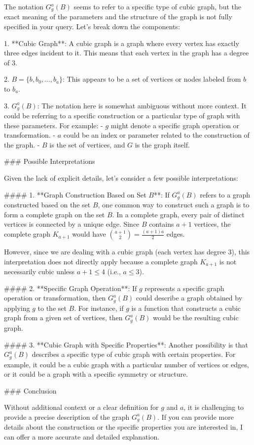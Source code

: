 The notation \( G^a_g(B) \) seems to refer to a specific type of cubic graph, but the exact meaning of the parameters and the structure of the graph is not fully specified in your query. Let's break down the components:

1. **Cubic Graph**: A cubic graph is a graph where every vertex has exactly three edges incident to it. This means that each vertex in the graph has a degree of 3.

2. \( B = \{b, b_0, \dots, b_a\} \): This appears to be a set of vertices or nodes labeled from \( b \) to \( b_a \).

3. \( G^a_g(B) \): The notation here is somewhat ambiguous without more context. It could be referring to a specific construction or a particular type of graph with these parameters. For example:
   - \( g \) might denote a specific graph operation or transformation.
   - \( a \) could be an index or parameter related to the construction of the graph.
   - \( B \) is the set of vertices, and \( G \) is the graph itself.

### Possible Interpretations

Given the lack of explicit details, let's consider a few possible interpretations:

#### 1. **Graph Construction Based on Set \( B \)**:
If \( G^a_g(B) \) refers to a graph constructed based on the set \( B \), one common way to construct such a graph is to form a complete graph on the set \( B \). In a complete graph, every pair of distinct vertices is connected by a unique edge. Since \( B \) contains \( a+1 \) vertices, the complete graph \( K_{a+1} \) would have \( \binom{a+1}{2} = \frac{(a+1)a}{2} \) edges.

However, since we are dealing with a cubic graph (each vertex has degree 3), this interpretation does not directly apply because a complete graph \( K_{a+1} \) is not necessarily cubic unless \( a+1 \leq 4 \) (i.e., \( a \leq 3 \)).

#### 2. **Specific Graph Operation**:
If \( g \) represents a specific graph operation or transformation, then \( G^a_g(B) \) could describe a graph obtained by applying \( g \) to the set \( B \). For instance, if \( g \) is a function that constructs a cubic graph from a given set of vertices, then \( G^a_g(B) \) would be the resulting cubic graph.

#### 3. **Cubic Graph with Specific Properties**:
Another possibility is that \( G^a_g(B) \) describes a specific type of cubic graph with certain properties. For example, it could be a cubic graph with a particular number of vertices or edges, or it could be a graph with a specific symmetry or structure.

### Conclusion

Without additional context or a clear definition for \( g \) and \( a \), it is challenging to provide a precise description of the graph \( G^a_g(B) \). If you can provide more details about the construction or the specific properties you are interested in, I can offer a more accurate and detailed explanation.